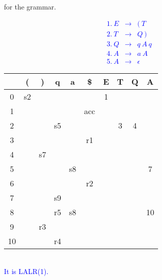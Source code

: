 \documentclass[10pt]{exam}
\begin{document}
\begin{enumerate}
\begin{enumerate}
                for the grammar.\\
                \textcolor{blue}{
                  \[\begin{array}{cll}
                      1. \ E & \rightarrow & ( \ T     \\
                      2. \ T & \rightarrow & Q \ )     \\
                      3. \ Q & \rightarrow & q \ A \ q \\
                      4. \ A & \rightarrow & a \ A     \\
                      5. \ A & \rightarrow & \epsilon
                    \end{array}\]
                  \begin{tabular}{|c|c|c|c|c|c|||c|c|c|c|}
                    \hline
                       & (  & )  & q  & a  & \$  & E & T & Q & A  \\
                    \hline
                    0  & s2 &    &    &    &     & 1 &   &   &    \\
                    \hline
                    1  &    &    &    &    & acc &   &   &   &    \\
                    \hline
                    2  &    &    & s5 &    &     &   & 3 & 4 &    \\
                    \hline
                    3  &    &    &    &    & r1  &   &   &   &    \\
                    \hline
                    4  &    & s7 &    &    &     &   &   &   &    \\
                    \hline
                    5  &    &    &    & s8 &     &   &   &   & 7  \\
                    \hline
                    6  &    &    &    &    & r2  &   &   &   &    \\
                    \hline
                    7  &    &    & s9 &    &     &   &   &   &    \\
                    \hline
                    8  &    &    & r5 & s8 &     &   &   &   & 10 \\
                    \hline
                    9  &    & r3 &    &    &     &   &   &   &    \\
                    \hline
                    10 &    &    & r4 &    &     &   &   &   &    \\
                    \hline
                  \end{tabular}\\
                  It is LALR(1).
                }
        \end{enumerate}


\end{enumerate}
\end{document}
